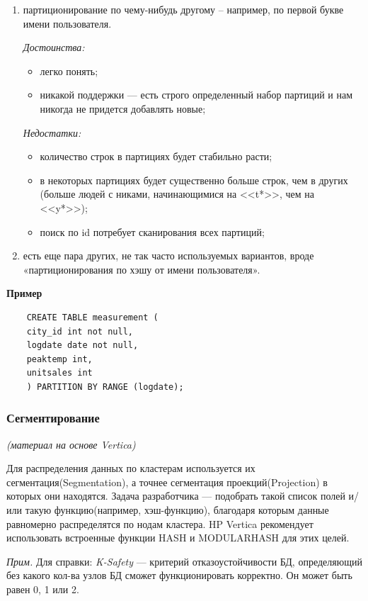 \begin{enumerate}
	\item партиционирование по чему-нибудь другому – например, по первой букве имени пользователя. 
	
	\textit{Достоинства:}
	\begin{itemize}[label=--]
		\item легко понять;
		\item никакой поддержки --- есть строго определенный набор партиций и нам никогда не придется добавлять новые;
	\end{itemize}
	
	\textit{Недостатки:}
	\begin{itemize}[label=--]
		\item количество строк в партициях будет стабильно расти; 
		\item в некоторых партициях будет существенно больше строк, чем в других (больше людей с никами, начинающимися на <<t*>>, чем на <<y*>>); 
		\item поиск по id потребует сканирования всех партиций;
	\end{itemize}
	
	\item есть еще пара других, не так часто используемых вариантов, вроде «партиционирования по
	хэшу от имени пользователя». 
	
\end{enumerate}

\textbf{Пример}

\begin{lstlisting}
	CREATE TABLE measurement (	
	city_id int not null,
	logdate date not null,
	peaktemp int,
	unitsales int
	) PARTITION BY RANGE (logdate);
\end{lstlisting}

\subsubsection{Сегментирование}
\textit{(материал на основе Vertica)}

Для распределения данных по кластерам используется их сегментация(Segmentation), а точнее сегментация проекций(Projection) в которых они находятся. Задача разработчика --- подобрать такой список полей и/или такую функцию(например, хэш-функцию), благодаря которым данные равномерно распределятся по нодам кластера. HP Vertica рекомендует
использовать встроенные функции HASH и MODULARHASH для этих целей. 

\textit{Прим.} Для справки: \textit{K-Safety} --- критерий отказоустойчивости БД, определяющий без какого кол-ва узлов БД сможет функционировать корректно. Он может быть равен 0, 1 или 2.

